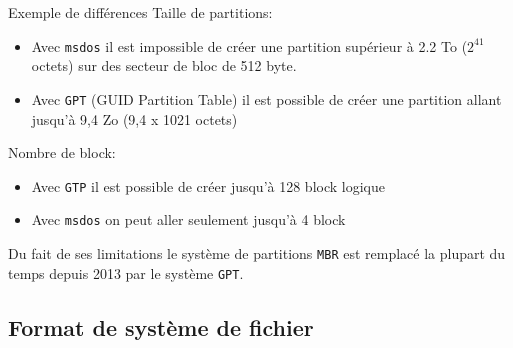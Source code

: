 \documentclass[compress]{beamer}
\begin{document}
\begin{frame}[fragile]{Exemple de différences}
Taille de partitions:
\begin{itemize}
	\item Avec \texttt{msdos} il est impossible de créer une partition supérieur à 2.2 To ($2^{41}$ octets) sur des secteur de bloc de 512 byte.
	\item Avec \texttt{GPT} (GUID Partition Table) il est possible de créer une partition allant jusqu'à 9,4 Zo (9,4 x 1021 octets)
\end{itemize}
Nombre de block:
\begin{itemize}
	\item Avec \texttt{GTP} il est possible de créer jusqu'à 128 block logique
	\item Avec \texttt{msdos} on peut aller seulement jusqu'à 4 block
\end{itemize}
Du fait de ses limitations le système de partitions \texttt{MBR} est remplacé la plupart du temps depuis 2013 par le système \texttt{GPT}.
\end{frame}

\subsection{Format de système de fichier}
\end{document}
